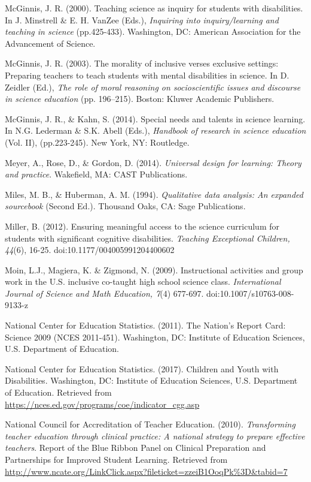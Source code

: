 \documentclass[11.5pt]{sig-alternate} %
\begin{document}
McGinnis, J. R. (2000). Teaching science as inquiry for students with disabilities. In J. Minstrell \& E. H. VanZee (Eds.), \textit{Inquiring into inquiry/learning and teaching in science} (pp.425-433). Washington, DC: American Association for the Advancement of Science. 

McGinnis, J. R. (2003). The morality of inclusive verses exclusive settings: Preparing teachers to teach students with mental disabilities in science. In D. Zeidler (Ed.), \textit{The role of moral	reasoning on socioscientific issues and discourse in science education} (pp. 196–215). 	Boston: Kluwer Academic Publishers.

McGinnis, J. R., \& Kahn, S. (2014). Special needs and talents in science learning. In N.G. Lederman \& S.K. Abell (Eds.), \textit{Handbook of research in science education} (Vol. II), (pp.223-245). New York, NY: Routledge.

Meyer, A., Rose, D., \& Gordon, D. (2014). \textit{Universal design for learning: Theory and practice}. Wakefield, MA: CAST Publications.

Miles, M. B., \& Huberman, A. M. (1994). \textit{Qualitative data analysis: An expanded sourcebook} (Second Ed.). Thousand Oaks, CA: Sage Publications.

Miller, B. (2012). Ensuring meaningful access to the science curriculum for students with significant cognitive disabilities. \textit{Teaching Exceptional Children, 44}(6), 16-25. doi:10.1177/004005991204400602

Moin, L.J., Magiera, K. \& Zigmond, N. (2009). Instructional activities and group work in the U.S. inclusive co-taught high school science class. \textit{International Journal of Science and Math Education, 7}(4) 677-697. doi:10.1007/s10763-008-9133-z

National Center for Education Statistics. (2011). The Nation’s Report Card: Science 2009 (NCES 2011-451). Washington, DC: Institute of Education Sciences, U.S. Department of Education.

National Center for Education Statistics. (2017). Children and Youth with Disabilities.	Washington, DC: Institute of Education Sciences, U.S. Department of Education. Retrieved from \url{https://nces.ed.gov/programs/coe/indicator\_cgg.asp}

National Council for Accreditation of Teacher Education. (2010). \textit{Transforming teacher education through clinical practice: A national strategy to prepare effective teachers}. Report of the Blue Ribbon Panel on Clinical Preparation and Partnerships for Improved Student Learning. Retrieved from \url{http://www.ncate.org/LinkClick.aspx?fileticket=zzeiB1OoqPk\%3D\&tabid=7}
\end{document}
